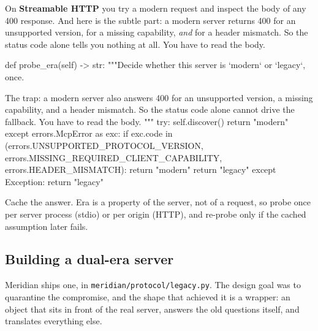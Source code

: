 On \textbf{Streamable HTTP} you try a modern request and inspect the body of any
400 response. And here is the subtle part: a modern server returns 400 for an
unsupported version, for a missing capability, \emph{and} for a header mismatch.
So the status code alone tells you nothing at all. You have to read the body.

\begin{py}
def probe_era(self) -> str:
    """Decide whether this server is `modern` or `legacy`, once.

    The trap: a modern server also answers 400 for an unsupported version,
    a missing capability, and a header mismatch. So the status code alone
    cannot drive the fallback. You have to read the body.
    """
    try:
        self.discover()
        return "modern"
    except errors.McpError as exc:
        if exc.code in (errors.UNSUPPORTED_PROTOCOL_VERSION,
                        errors.MISSING_REQUIRED_CLIENT_CAPABILITY,
                        errors.HEADER_MISMATCH):
            return "modern"
        return "legacy"
    except Exception:
        return "legacy"
\end{py}

Cache the answer. Era is a property of the server, not of a request, so probe
once per server process (stdio) or per origin (HTTP), and re-probe only if the
cached assumption later fails.

\subsection{Building a dual-era server}

Meridian ships one, in \texttt{meridian/protocol/legacy.py}. The design goal was to quarantine the compromise, and the shape that achieved it
is a wrapper: an object that sits in front of the real
server, answers the old questions itself, and translates everything else.

